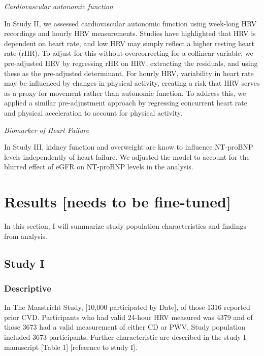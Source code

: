 \documentclass[
  a4paper,
  headsepline=true,
  open=any]{scrbook}
\begin{document}
\emph{Cardiovascular autonomic function}

In Study II, we assessed cardiovascular autonomic function using
week-long HRV recordings and hourly HRV measurements. Studies have
highlighted that HRV is dependent on heart rate, and low HRV may simply
reflect a higher resting heart rate (rHR). To adjust for this without
overcorrecting for a collinear variable, we pre-adjusted HRV by
regressing rHR on HRV, extracting the residuals, and using these as the
pre-adjusted determinant. For hourly HRV, variability in heart rate may
be influenced by changes in physical activity, creating a risk that HRV
serves as a proxy for movement rather than autonomic function. To
address this, we applied a similar pre-adjustment approach by regressing
concurrent heart rate and physical acceleration to account for physical
activity.

\emph{Biomarker of Heart Failure}

In Study III, kidney function and overweight are know to influence
NT-proBNP levels independently of heart failure. We adjusted the model
to account for the blurred effect of eGFR on NT-proBNP levels in the
analysis.


\hypertarget{results-needs-to-be-fine-tuned}{%
\chapter{Results {[}needs to be
fine-tuned{]}}\label{results-needs-to-be-fine-tuned}}

In this section, I will summarize study population characteristics and
findings from analysis.

\hypertarget{study-i-1}{%
\section{Study I}\label{study-i-1}}

\hypertarget{descriptive}{%
\subsection{Descriptive}\label{descriptive}}

In The Maastricht Study, {[}10,000 participated by Date{]}, of those
1316 reported prior CVD. Participants who had valid 24-hour HRV measured
was 4379 and of those 3673 had a valid measurement of either CD or PWV.
Study population included 3673 participants. Further characteristic are
described in the study I manuscript {[}Table 1{]} {[}refeernce to study
I{]}.
\end{document}
